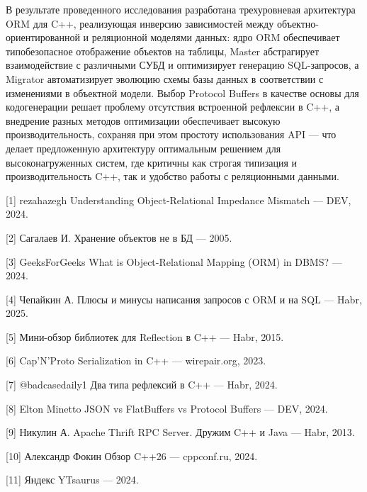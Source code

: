 
    В результате проведенного исследования разработана трехуровневая архитектура ORM для C++, реализующая инверсию зависимостей между объектно-ориентированной и реляционной моделями данных: ядро ORM обеспечивает типобезопасное отображение объектов на таблицы, Master абстрагирует взаимодействие с различными СУБД и оптимизирует генерацию SQL-запросов, а Migrator автоматизирует эволюцию схемы базы данных в соответствии с изменениями в объектной модели. Выбор Protocol Buffers в качестве основы для кодогенерации решает проблему отсутствия встроенной рефлексии в C++, а внедрение разных методов оптимизации обеспечивает высокую производительность, сохраняя при этом простоту использования API — что делает предложенную архитектуру оптимальным решением для высоконагруженных систем, где критичны как строгая типизация и производительность C++, так и удобство работы с реляционными данными.


    [1] rezahazegh Understanding Object-Relational Impedance Mismatch — DEV, 2024.

    [2] Сагалаев И. Хранение объектов не в БД — 2005.

    [3] GeeksForGeeks What is Object-Relational Mapping (ORM) in DBMS? — 2024.

    [4] Чепайкин А. Плюсы и минусы написания запросов с ORM и на SQL — Habr, 2025.

    [5] Мини-обзор библиотек для Reflection в C++ — Habr, 2015.

    [6] Cap'N'Proto Serialization in C++ — wirepair.org, 2023.

    [7] @badcasedaily1 Два типа рефлексий в C++ — Habr, 2024.

    [8] Elton Minetto JSON vs FlatBuffers vs Protocol Buffers — DEV, 2024.

    [9] Никулин А. Apache Thrift RPC Server. Дружим C++ и Java — Habr, 2013.

    [10] Александр Фокин Обзор C++26 — cppconf.ru, 2024.

    [11] Яндекс YTsaurus — 2024.



